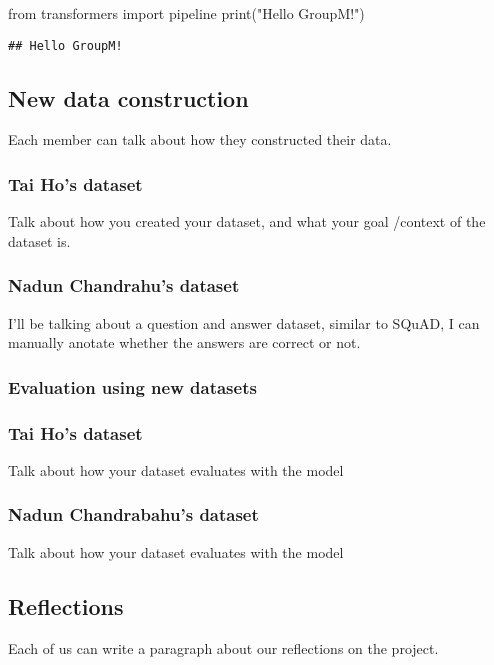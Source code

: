 \documentclass[
  11pt,
]{article}
\newenvironment{Shaded}{\begin{snugshade}}{\end{snugshade}}
\newcommand{\BuiltInTok}[1]{#1}
\newcommand{\ImportTok}[1]{#1}
\newcommand{\NormalTok}[1]{#1}
\newcommand{\StringTok}[1]{\textcolor[rgb]{0.31,0.60,0.02}{#1}}
\begin{document}
\begin{Shaded}
\begin{Highlighting}[]
\ImportTok{from}\NormalTok{ transformers }\ImportTok{import}\NormalTok{ pipeline}
\BuiltInTok{print}\NormalTok{(}\StringTok{"Hello GroupM!"}\NormalTok{)}
\end{Highlighting}
\end{Shaded}

\begin{verbatim}
## Hello GroupM!
\end{verbatim}

\subsection{New data construction}\label{new-data-construction}

Each member can talk about how they constructed their data.

\subsubsection{Tai Ho's dataset}\label{tai-hos-dataset}

Talk about how you created your dataset, and what your goal /context of
the dataset is.

\subsubsection{Nadun Chandrahu's
dataset}\label{nadun-chandrahus-dataset}

I'll be talking about a question and answer dataset, similar to SQuAD, I
can manually anotate whether the answers are correct or not.

\subsubsection{Evaluation using new
datasets}\label{evaluation-using-new-datasets}

\subsubsection{Tai Ho's dataset}\label{tai-hos-dataset-1}

Talk about how your dataset evaluates with the model

\subsubsection{Nadun Chandrabahu's
dataset}\label{nadun-chandrabahus-dataset}

Talk about how your dataset evaluates with the model

\subsection{Reflections}\label{reflections}

Each of us can write a paragraph about our reflections on the project.
\end{document}
